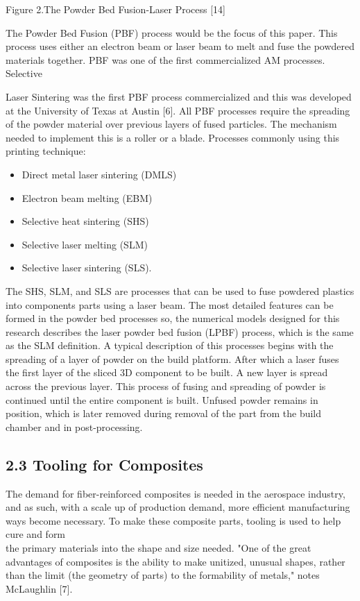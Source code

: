 \documentclass[10pt]{article}
\begin{document}
Figure 2.The Powder Bed Fusion-Laser Process [14]

The Powder Bed Fusion (PBF) process would be the focus of this paper. This process uses either an electron beam or laser beam to melt and fuse the powdered materials together. PBF was one of the first commercialized AM processes. Selective

Laser Sintering was the first PBF process commercialized and this was developed at the University of Texas at Austin [6]. All PBF processes require the spreading of the powder material over previous layers of fused particles. The mechanism needed to implement this is a roller or a blade. Processes commonly using this printing technique:

\begin{itemize}
  \item Direct metal laser sintering (DMLS)

  \item Electron beam melting (EBM)

  \item Selective heat sintering (SHS)

  \item Selective laser melting (SLM)

  \item Selective laser sintering (SLS).

\end{itemize}

The SHS, SLM, and SLS are processes that can be used to fuse powdered plastics into components parts using a laser beam. The most detailed features can be formed in the powder bed processes so, the numerical models designed for this research describes the laser powder bed fusion (LPBF) process, which is the same as the SLM definition. A typical description of this processes begins with the spreading of a layer of powder on the build platform. After which a laser fuses the first layer of the sliced 3D component to be built. A new layer is spread across the previous layer. This process of fusing and spreading of powder is continued until the entire component is built. Unfused powder remains in position, which is later removed during removal of the part from the build chamber and in post-processing.

\subsection*{2.3 Tooling for Composites}
The demand for fiber-reinforced composites is needed in the aerospace industry, and as such, with a scale up of production demand, more efficient manufacturing ways become necessary. To make these composite parts, tooling is used to help cure and form\\
the primary materials into the shape and size needed. "One of the great advantages of composites is the ability to make unitized, unusual shapes, rather than the limit (the geometry of parts) to the formability of metals," notes McLaughlin [7].
\end{document}

